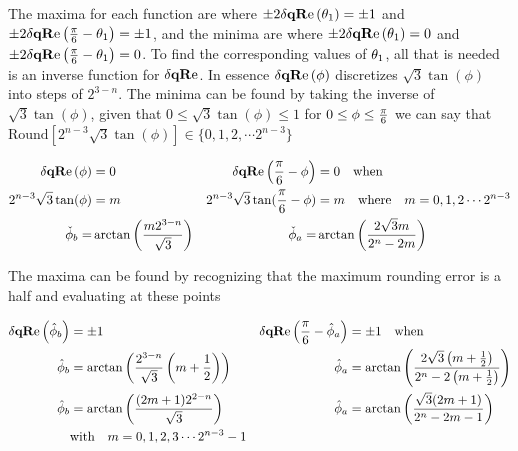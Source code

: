 The maxima for each function are where $\pm 2 \dqRe[ \thetaA ]  = \pm 1$ and $\pm 2 \dqRe[ \Pii{6} -\thetaA]= \pm 1$, and the minima are where $\pm 2 \dqRe[ \thetaA ]  = 0$ and $\pm 2 \dqRe[ \Pii{6} -\thetaA] = 0$. To find the corresponding values of $\theta_1$, all that is needed is an inverse function for $\dqRe$. In essence $\dqRe[\phi]$ discretizes $\sqrt{3} \tan (\phi )$ into steps of $2^{3-n}$. The minima can be found by taking the inverse of $\sqrt{3} \tan (\phi )$, given that
$0\le\sqrt{3} \tan (\phi )\le1$ for $0 \le \phi \le \frac{\pi}{6}$ we can say that $\text{Round}\left[ 2^{n-3}\sqrt{3} \tan (\phi ) \right] \in \{ 0, 1, 2, \cdots 2^{n-3} \}$ 


\begin{align*}
\dqRe[\phi] & = 0 & \dqRe[\Pii{6}-\phi] & = 0 \quad \text{when} \\
2^{n-3}\sqrt{3} \tan (\phi ) & = m & 
2^{n-3}\sqrt{3} \tan (\Pii{6}-\phi ) &= m \quad \text{where}\quad m=0,1,2 \cdots 2^{n-3} \\
 \minimaTheta{b} = & \arctan\left(\frac{m 2^{3-n}}{\sqrt{3}}  \right) &
 \minimaTheta{a} = & \arctan\left(\frac{2 \sqrt{3} m}{2^n - 2 m}\right) 
\end{align*}

The maxima can be found by recognizing that the maximum rounding error is a half and evaluating at these points

\begin{align*}
\dqRe[\maximaTheta{b} ] & = \pm 1 & \dqRe[\Pii{6}-\maximaTheta{a} ] & = \pm 1  \quad \text{when} \\
\maximaTheta{b} & =\arctan\left(\frac{ 2^{3-n} }{\sqrt{3}} \left(m+\frac{1}{2}\right) \right) &
\maximaTheta{a} & = \arctan\left(\frac{2 \sqrt{3} \left(m+\frac{1}{2}\right)}{2^n - 2 \left(m+\frac{1}{2}\right)}\right)  \\
 \maximaTheta{b}  &=  \arctan\left(\frac{(2 m+1) 2^{2-n}}{\sqrt{3}}          \right) &
  \maximaTheta{a}  &=  \arctan\left(\frac{\sqrt{3} (2 m+1)}{2^n-2 m-1}  \right) \\
  \quad&\text{with}\quad   m =  0,1,2,3 \cdots2^{n-3}-1 
\end{align*}

